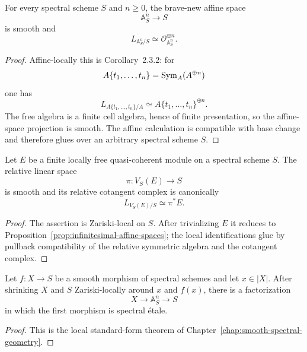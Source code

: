 \begin{proposition}
\label{prop:infinitesimal-affine-spaces}
For every spectral scheme $S$ and $n\geq0$, the brave-new affine space
\[
    \mathbb A^n_S\longrightarrow S
\]
is smooth and
\[
    L_{\mathbb A^n_S/S}
    \simeq
    \mathcal O_{\mathbb A^n_S}^{\oplus n}.
\]
\end{proposition}

\begin{proof}
Affine-locally this is Corollary~2.3.2: for
\[
    A\{t_1,\ldots,t_n\}=\operatorname{Sym}_A(A^{\oplus n})
\]
one has
\[
    L_{A\{t_1,\ldots,t_n\}/A}
    \simeq
    A\{t_1,\ldots,t_n\}^{\oplus n}.
\]
The free algebra is a finite cell algebra, hence of finite presentation, so
the affine-space projection is smooth.  The affine calculation is compatible
with base change and therefore glues over an arbitrary spectral scheme $S$.
\end{proof}

\begin{proposition}
\label{prop:infinitesimal-vector-spaces}
Let $E$ be a finite locally free quasi-coherent module on a spectral scheme
$S$.  The relative linear space
\[
    \pi:V_S(E)\longrightarrow S
\]
is smooth and its relative cotangent complex is canonically
\[
    L_{V_S(E)/S}\simeq\pi^*E.
\]
\end{proposition}

\begin{proof}
The assertion is Zariski-local on $S$.  After trivializing $E$ it reduces to
Proposition~\ref{prop:infinitesimal-affine-spaces}; the local identifications
glue by pullback compatibility of the relative symmetric algebra and the
cotangent complex.
\end{proof}

\begin{theorem}
\label{thm:infinitesimal-local-coordinates}
Let $f:X\to S$ be a smooth morphism of spectral schemes and let $x\in|X|$.
After shrinking $X$ and $S$ Zariski-locally around $x$ and $f(x)$, there is a
factorization
\[
    X\longrightarrow\mathbb A^n_S\longrightarrow S
\]
in which the first morphism is spectral \'etale.
\end{theorem}

\begin{proof}
This is the local standard-form theorem of
Chapter~\ref{chap:smooth-spectral-geometry}.
\end{proof}


